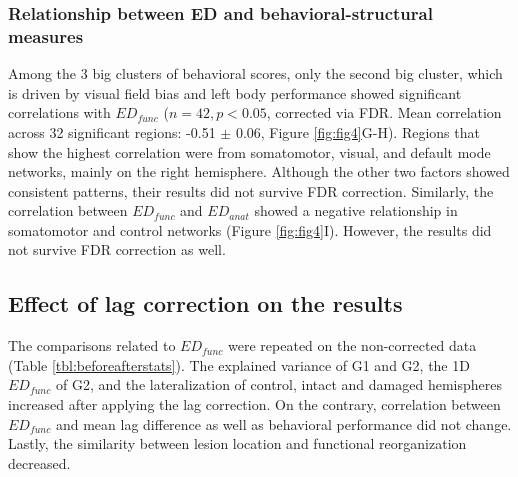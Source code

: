 \documentclass[fleqn,10pt]{wlscirep}
\begin{document}
\subsubsection*{Relationship between ED and behavioral-structural measures}

Among the 3 big clusters of behavioral scores, only the second big cluster, which is driven by visual field bias and left body performance showed significant correlations with $\textit{ED}_{{func}}$ ($ n = 42, p < 0.05$, corrected via FDR. Mean correlation across 32 significant regions: -0.51 $\pm$ 0.06, Figure \ref{fig:fig4}G-H). Regions that show the highest correlation were from somatomotor, visual, and default mode networks, mainly on the right hemisphere. Although the other two factors showed consistent patterns, their results did not survive FDR correction. Similarly, the correlation between $\textit{ED}_{{func}}$ and $\textit{ED}_{{anat}}$ showed a negative relationship in somatomotor and control networks (Figure \ref{fig:fig4}I). However, the results did not survive FDR correction as well.

\subsection*{Effect of lag correction on the results}
The comparisons related to $\textit{ED}_{{func}}$ were repeated on the non-corrected data (Table \ref{tbl:beforeafterstats}). The explained variance of G1 and G2, the 1D $\textit{ED}_{{func}}$ of G2, and the lateralization of control, intact and damaged hemispheres increased after applying the lag correction. On the contrary, correlation between $\textit{ED}_{{func}}$ and mean lag difference as well as behavioral performance did not change. Lastly, the similarity between lesion location and functional reorganization decreased. 
\end{document}
